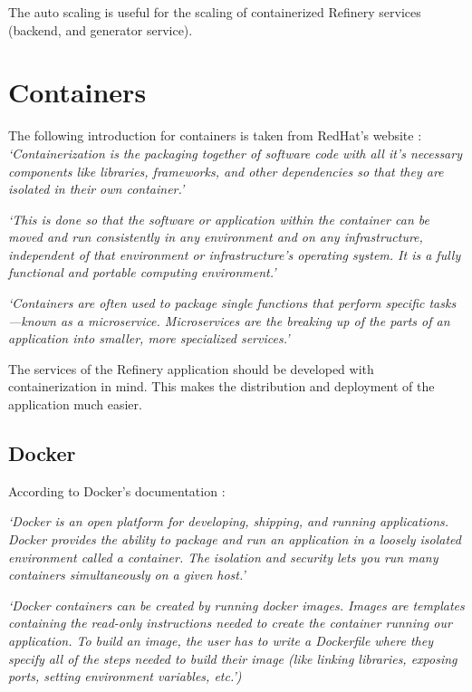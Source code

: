 		The auto scaling is useful for the scaling of containerized Refinery services (backend, and generator service).

\section{Containers} \label{backgcontainer}
	The following introduction for containers is taken from RedHat's website \cite{container}:
	\textit{
	`Containerization \cite{container} is the packaging together of software code with all it’s necessary 
	components like 
	libraries, frameworks, and other dependencies so that they are isolated in their own container.'}
	
	\textit{`This is done so that the software or application within the container can be moved and run consistently 
	in any environment and on any infrastructure, independent of that environment or infrastructure’s 
	operating system. It is a fully functional 
	and portable computing environment.'}

	\textit{`Containers are often used to package single functions that perform specific tasks—known as a microservice. 
	Microservices are the breaking up of the parts of an application into smaller, more specialized services.'}

	The services of the Refinery application should be developed with containerization in mind. This makes 
	the distribution and deployment of the application much easier.

	\subsection{Docker} \label{backgdocker}
		According to Docker's documentation \cite{docker}:

		\textit{
			`Docker \cite{docker} is an open platform for developing, shipping, and running applications. 
			Docker provides the ability to package and run an application in a loosely isolated environment 
			called a container. The isolation and security lets you run many containers simultaneously 
			on a given host.'
		}

		\textit{
			`Docker containers can be created by running docker images. Images are templates 
			containing the read-only instructions needed 
			to create the container running our application. To build an image, the user has to write a Dockerfile
			where they specify all of the steps needed to build their image (like linking libraries, exposing ports, 
			setting environment variables, etc.')
		}

